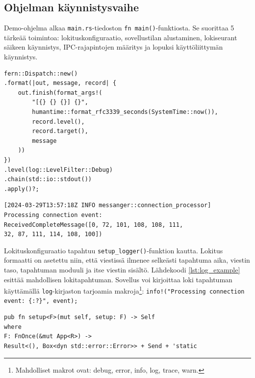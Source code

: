 \documentclass[a4paper,12pt]{article}
\begin{document}
    \subsection{Ohjelman käynnistysvaihe}

    Demo-ohjelma alkaa \lstinline{main.rs}-tiedoston \lstinline{fn main()}-funktiosta. 
    Se suorittaa 5 tärkeää toimintoa: lokituskonfiguraatio, sovellustilan alustaminen, lokiseurant säikeen käynnistys, IPC-rajapintojen määritys ja lopuksi käyttöliittymän käynnistys. \\

    \begin{lstlisting}[caption={Lokituskonfiguraatio}, label={lst:logging_config}]
fern::Dispatch::new()
.format(|out, message, record| {
    out.finish(format_args!(
        "[{} {} {}] {}",
        humantime::format_rfc3339_seconds(SystemTime::now()),
        record.level(),
        record.target(),
        message
    ))
})
.level(log::LevelFilter::Debug)
.chain(std::io::stdout())
.apply()?;
    \end{lstlisting} 

    \begin{lstlisting}[caption={Esimerkki lokitapahtumasta}, label={lst:log_example}]
[2024-03-29T13:57:18Z INFO messanger::connection_processor]
Processing connection event:
ReceivedCompleteMessage([0, 72, 101, 108, 108, 111, 
32, 87, 111, 114, 108, 100])
    \end{lstlisting}
    

    Lokituskonfiguraatio tapahtuu \lstinline{setup_logger()}-funktion kautta. 
    Lokitus formaatti on asetettu niin, että viestissä ilmenee selkeästi tapahtuma aika,
    viestin taso, tapahtuman moduuli ja itse viestin sisältö. Lähdekoodi \ref{lst:log_example} esittää mahdollisen lokitapahtuman. Sovellus voi kirjoittaa loki tapahtuman käyttämällä \lstinline{log}-kirjaston tarjoamia makroja\footnote{Mahdolliset makrot ovat: debug, error, info, log, trace, warn.}: \lstinline|info!("Processing connection event: {:?}", event);|\par


    
    \begin{lstlisting}[caption={Setup-funktion tunniste}, label={lst:setup_signature}]
pub fn setup<F>(mut self, setup: F) -> Self
where
F: FnOnce(&mut App<R>) -> 
Result<(), Box<dyn std::error::Error>> + Send + 'static
\end{lstlisting}
    
\end{document}
